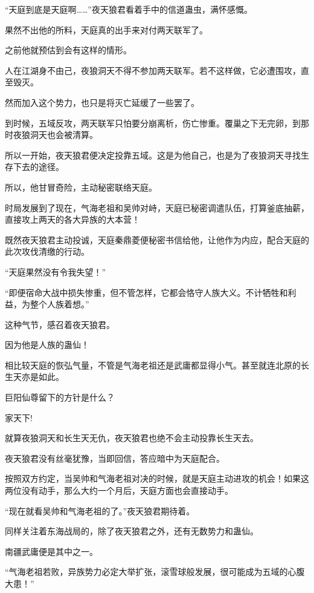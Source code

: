 
\begin{this_body}



“天庭到底是天庭啊……”夜天狼君看着手中的信道蛊虫，满怀感慨。

果然不出他的所料，天庭真的出手来对付两天联军了。

之前他就预估到会有这样的情形。

人在江湖身不由己，夜狼洞天不得不参加两天联军。若不这样做，它必遭围攻，直至毁灭。

然而加入这个势力，也只是将灭亡延缓了一些罢了。

到时候，五域反攻，两天联军只怕要分崩离析，伤亡惨重。覆巢之下无完卵，到那时夜狼洞天也会被清算。

所以一开始，夜天狼君便决定投靠五域。这是为他自己，也是为了夜狼洞天寻找生存下去的途径。

所以，他甘冒奇险，主动秘密联络天庭。

时局发展到了现在，气海老祖和吴帅对峙，天庭已秘密调遣队伍，打算釜底抽薪，直接攻上两天的各大异族的大本营！

既然夜天狼君主动投诚，天庭秦鼎菱便秘密书信给他，让他作为内应，配合天庭的此次攻伐清缴的行动。

“天庭果然没有令我失望！”

“即便宿命大战中损失惨重，但不管怎样，它都会恪守人族大义。不计牺牲和利益，为整个人族着想。”

这种气节，感召着夜天狼君。

因为他是人族的蛊仙！

相比较天庭的恢弘气量，不管是气海老祖还是武庸都显得小气。甚至就连北原的长生天亦是如此。

巨阳仙尊留下的方针是什么？

家天下!

就算夜狼洞天和长生天无仇，夜天狼君也绝不会主动投靠长生天去。

夜天狼君没有丝毫犹豫，当即回信，答应暗中为天庭配合。

按照双方约定，当吴帅和气海老祖对决的时候，就是天庭主动进攻的机会！如果这两位没有动手，那么大约一个月后，天庭方面也会直接动手。

“现在就看吴帅和气海老祖的了。”夜天狼君期待着。

同样关注着东海战局的，除了夜天狼君之外，还有无数势力和蛊仙。

南疆武庸便是其中之一。

“气海老祖若败，异族势力必定大举扩张，滚雪球般发展，很可能成为五域的心腹大患！”


\end{this_body}
